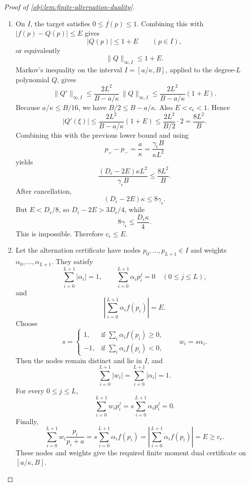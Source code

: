 \begin{proof}[Proof of \cref{obj:lem:finite-alternation-duality}]
\begin{enumerate}
\item On \(I\), the target satisfies \(0\le f(p)\le1\). Combining this with \(|f(p)-Q(p)|\le E\) gives
\[
|Q(p)|\le 1+E\qquad (p\in I),
\]
or equivalently
\[
\|Q\|_{\infty,I}\le 1+E.
\]
Markov's inequality on the interval \(I=[a/\kappa,B]\), applied to the degree-\(L\) polynomial \(Q\), gives
\[
\|Q'\|_{\infty,I}
\le
\frac{2L^2}{B-a/\kappa}\,\|Q\|_{\infty,I}
\le
\frac{2L^2}{B-a/\kappa}(1+E).
\]
Because \(a/\kappa\le B/16\), we have \(B/2\le B-a/\kappa\). Also \(E<c_\epsilon<1\). Hence
\[
|Q'(\xi)|
\le
\frac{2L^2}{B-a/\kappa}(1+E)
\le
\frac{2L^2}{B/2}\cdot2
=
\frac{8L^2}{B}.
\]
Combining this with the previous lower bound and using
\[
p_+-p_-=\frac{a}{\kappa}
=\frac{\gamma_\epsilon B}{\kappa L^2}
\]
yields
\[
\frac{(D_\epsilon-2E)\kappa L^2}{\gamma_\epsilon B}
\le
\frac{8L^2}{B}.
\]
After cancellation,
\[
(D_\epsilon-2E)\kappa\le 8\gamma_\epsilon.
\]
But \(E<D_\epsilon/8\), so \(D_\epsilon-2E>3D_\epsilon/4\), while
\[
8\gamma_\epsilon\le \frac{D_\epsilon\kappa}{4}.
\]
This is impossible. Therefore \(c_\epsilon\le E\). %

\item Let the alternation certificate have nodes \(p_0,\ldots,p_{L+1}\in I\) and weights \(\alpha_0,\ldots,\alpha_{L+1}\). They satisfy
\[
\sum_{i=0}^{L+1}|\alpha_i|=1,
\qquad
\sum_{i=0}^{L+1}\alpha_i p_i^j=0\quad(0\le j\le L),
\]
and
\[
\left|\sum_{i=0}^{L+1}\alpha_i f(p_i)\right|=E.
\]
Choose
\[
s=
\begin{cases}
1,&\text{if }\sum_i\alpha_i f(p_i)\ge0,\\
-1,&\text{if }\sum_i\alpha_i f(p_i)<0,
\end{cases}
\qquad
w_i=s\alpha_i .
\]
Then the nodes remain distinct and lie in \(I\), and
\[
\sum_{i=0}^{L+1}|w_i|
=
\sum_{i=0}^{L+1}|\alpha_i|
=1.
\]
For every \(0\le j\le L\),
\[
\sum_{i=0}^{L+1}w_i p_i^j
=
s\sum_{i=0}^{L+1}\alpha_i p_i^j
=0.
\]
Finally,
\[
\sum_{i=0}^{L+1}w_i\frac{p_i}{p_i+a}
=
s\sum_{i=0}^{L+1}\alpha_i f(p_i)
=
\left|\sum_{i=0}^{L+1}\alpha_i f(p_i)\right|
=
E
\ge c_\epsilon.
\]
These nodes and weights give the required finite moment dual certificate on \([a/\kappa,B]\). %
\end{enumerate}
\end{proof}
